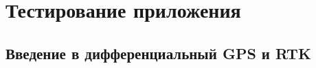 \chapter{Тестирование приложения} \label{chapt4}

\section{Введение в дифференциальный GPS и RTK} \label{sect4_1}